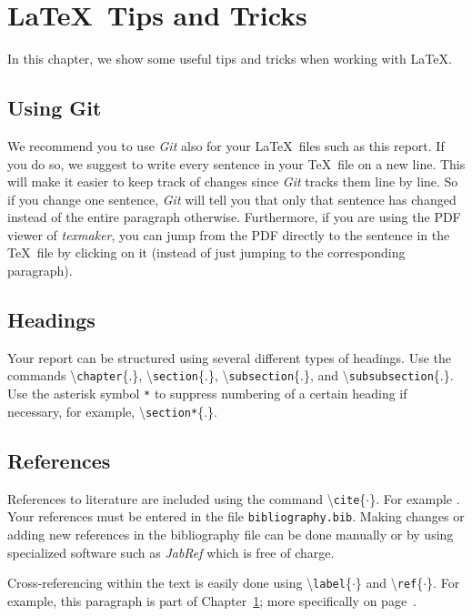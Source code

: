 \chapter{\LaTeX\ Tips and Tricks}\label{chap:tipstricks}

In this chapter, we show some useful tips and tricks when working with \LaTeX.

\section{Using Git}

We recommend you to use \emph{Git} also for your \LaTeX\ files such as this report.
If you do so, we suggest to write every sentence in your \TeX\ file on a new line.
This will make it easier to keep track of changes since \emph{Git} tracks them line by line.
So if you change one sentence, \emph{Git} will tell you that only that sentence has changed instead of the entire paragraph otherwise.
Furthermore, if you are using the PDF viewer of \emph{texmaker}, you can jump from the PDF directly to the sentence in the \TeX\ file by clicking on it (instead of just jumping to the corresponding paragraph).

\section{Headings}

Your report can be structured using several different types of headings.
Use the commands \textbackslash\texttt{chapter}\{.\}, \textbackslash\texttt{section}\{.\}, \textbackslash\texttt{subsection}\{.\}, and \textbackslash\texttt{subsubsection}\{.\}.
Use the asterisk symbol \texttt{*} to suppress numbering of a certain heading if necessary, for example, \textbackslash\texttt{section*}\{.\}.


\section{References}\label{sec:references}

References to literature are included using the command \textbackslash\texttt{cite}\{$\cdot$\}.
For example \cite{KleinMurray2007,Strasdat2010WhyFilter}.
Your references must be entered in the file \texttt{bibliography.bib}.
Making changes or adding new references in the bibliography file can be done manually or by using specialized software such as \textit{JabRef} which is free of charge.

Cross-referencing within the text is easily done using \textbackslash\texttt{label}\{$\cdot$\} and \textbackslash\texttt{ref}\{$\cdot$\}.
For example, this paragraph is part of Chapter~\ref{chap:tipstricks}; more specifically on page~\pageref{sec:references}.

